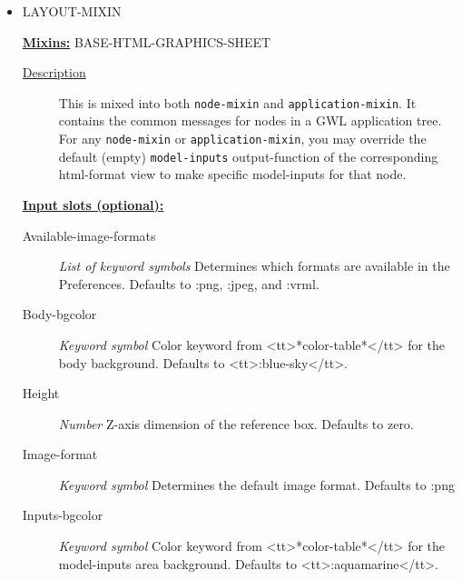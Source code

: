 \documentclass [11pt]{book}
\begin{document}
\begin{itemize}
\item {}LAYOUT-MIXIN


\textbf{
\underline{Mixins:}} BASE-HTML-GRAPHICS-SHEET





\begin{description}

\item [
\underline{Description}]


This is mixed into both \texttt{node-mixin} and \texttt{application-mixin}. It contains the common
messages for nodes in a GWL application tree. For any \texttt{node-mixin} or \texttt{application-mixin}, you may override the default (empty)
\texttt{model-inputs} output-function of the corresponding html-format view to make specific model-inputs for that node.



\end{description}








\textbf{
\underline{Input slots (optional):}}

\begin{description}

\item [Available-image-formats]
\emph{List of keyword symbols} Determines which formats are available in the Preferences. Defaults to :png, :jpeg, and :vrml.


\item [Body-bgcolor]
\emph{Keyword symbol} Color keyword from <tt>*color-table*</tt> for the body background. Defaults to <tt>:blue-sky</tt>.


\item [Height]
\emph{Number} Z-axis dimension of the reference box. Defaults to zero.


\item [Image-format]
\emph{Keyword symbol} Determines the default image format. Defaults to :png


\item [Inputs-bgcolor]
\emph{Keyword symbol} Color keyword from <tt>*color-table*</tt> for the model-inputs area background. Defaults to <tt>:aquamarine</tt>.



\end{description}
\end{itemize}
\end{document}
